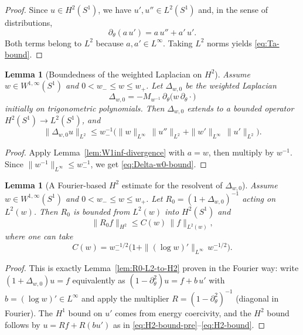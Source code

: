 \documentclass{amsart}
\numberwithin{equation}{section}
\newtheorem{lemma}[theorem]{Lemma}
\theoremstyle{definition}
\theoremstyle{remark}
\begin{document}
\begin{proof}
Since $u\in H^2(S^1)$, we have $u',u''\in L^2(S^1)$ and, in the sense of distributions,
\[
\partial_\theta(a\,u') = a\,u'' + a'\,u'.
\]
Both terms belong to $L^2$ because $a,a'\in L^\infty$.
Taking $L^2$ norms yields \eqref{eq:Ta-bound}.
\end{proof}

\begin{lemma}[Boundedness of the weighted Laplacian on $H^2$]
\label{lem:Delta-w0-H2-to-L2}
Assume $w\in W^{1,\infty}(S^1)$ and $0<w_-\le w\le w_+$.
Let $\Delta_{w,0}$ be the weighted Laplacian
\[
\Delta_{w,0} = -M_{w^{-1}}\,\partial_\theta\big(w\,\partial_\theta\cdot\big)
\]
initially on trigonometric polynomials.
Then $\Delta_{w,0}$ extends to a bounded operator $H^2(S^1)\to L^2(S^1)$, and
\begin{equation}\label{eq:Delta-w0-bound}
\|\Delta_{w,0}u\|_{L^2}
\le
w_-^{-1}\Big(
\|w\|_{L^\infty}\,\|u''\|_{L^2}+\|w'\|_{L^\infty}\,\|u'\|_{L^2}
\Big).
\end{equation}
\end{lemma}

\begin{proof}
Apply Lemma~\ref{lem:W1inf-divergence} with $a=w$, then multiply by $w^{-1}$.
Since $\|w^{-1}\|_{L^\infty}\le w_-^{-1}$, we get \eqref{eq:Delta-w0-bound}.
\end{proof}

\begin{lemma}[A Fourier-based $H^2$ estimate for the resolvent of $\Delta_{w,0}$]
\label{lem:R0-L2-to-H2-correct}
Assume $w\in W^{1,\infty}(S^1)$ and $0<w_-\le w\le w_+$.
Let $R_0=(1+\Delta_{w,0})^{-1}$ acting on $L^2(w)$.
Then $R_0$ is bounded from $L^2(w)$ into $H^2(S^1)$ and
\begin{equation}\label{eq:R0-H2-bound-correct}
\|R_0 f\|_{H^2}\le C(w)\,\|f\|_{L^2(w)},
\end{equation}
where one can take
\[
C(w)= w_-^{-1/2}\Big(1+\|(\log w)'\|_{L^\infty}\,w_-^{-1/2}\Big).
\]
\end{lemma}

\begin{proof}
This is exactly Lemma~\ref{lem:R0-L2-to-H2} proven in the Fourier way:
write $(1+\Delta_{w,0})u=f$ equivalently as
\(
(1-\partial_\theta^2)u=f+b\,u'
\)
with $b=(\log w)'\in L^\infty$ and apply the multiplier
$R=(1-\partial_\theta^2)^{-1}$ (diagonal in Fourier).
The $H^1$ bound on $u'$ comes from energy coercivity, and the $H^2$ bound follows by
\(
u=Rf+R(bu')
\)
as in \eqref{eq:H2-bound-pre}--\eqref{eq:H2-bound}.
\end{proof}
\end{document}
